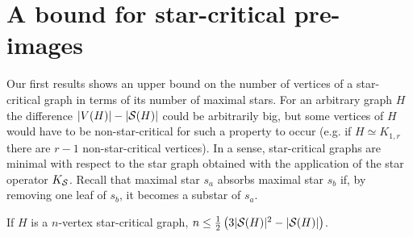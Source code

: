 \section{A bound for star-critical pre-images}

Our first results shows an upper bound on the number of vertices of a star-critical graph in terms of its number of maximal stars.
For an arbitrary graph $H$ the difference $|V(H)| - |\mathcal{S}(H)|$ could be arbitrarily big, but some vertices of $H$ would have to be non-star-critical for such a property to occur (e.g. if $H \simeq K_{1,r}$ there are $r-1$ non-star-critical vertices).
In a sense, star-critical graphs are minimal with respect to the star graph obtained with the application of the star operator $K_{\mathcal{S}}$.
Recall that maximal star $s_a$ absorbs maximal star $s_b$ if, by removing one leaf of $s_b$, it becomes a substar of $s_a$.

\begin{theorem}
    \label{thm:bound}
    If $H$ is a $n$-vertex star-critical graph, $n \leq \frac{1}{2}\left(3|\mathcal{S}(H)|^2 - |\mathcal{S}(H)|\right)$.
\end{theorem}

